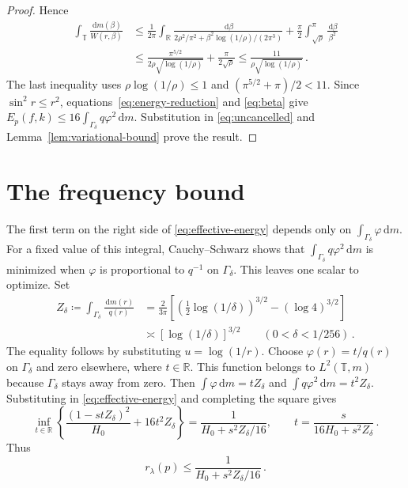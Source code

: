 \documentclass[11pt]{amsart}
\theoremstyle{plain}
\theoremstyle{definition}
\newcommand{\R}{\mathbb R}
\newcommand{\T}{\mathbb T}
\newcommand{\1}{\mathbf 1}
\newcommand{\dd}{\,\mathrm d}
\begin{document}
\begin{proof}
		Hence
		\begin{equation}\label{eq:beta}
			\begin{split}
				\int_\T\frac{\dd m(\beta)}{W(r,\beta)}
				&\leq\frac1{2\pi}\int_\R
				\frac{\dd\beta}{2\rho^2/\pi^2+
					\beta^2\log(1/\rho)/(2\pi^3)}
				+\frac\pi2\int_{\sqrt\rho}^\pi\frac{\dd\beta}{\beta^2}\\
				&\leq\frac{\pi^{5/2}}{2\rho\sqrt{\log(1/\rho)}}
				+\frac\pi{2\sqrt\rho}
				\leq\frac{11}{\rho\sqrt{\log(1/\rho)}}\, .
			\end{split}
		\end{equation}
		The last inequality uses $\rho\log(1/\rho)\leq1$ and
		$(\pi^{5/2}+\pi)/2<11$.
		Since $\sin^2r\leq r^2$, equations~\eqref{eq:energy-reduction} and
		\eqref{eq:beta} give $E_p(f,k)\leq16\int_{\Gamma_\delta}q\varphi^2\dd m$.
		Substitution in \eqref{eq:uncancelled} and Lemma~\ref{lem:variational-bound}
		prove the result.
	\end{proof}
	
	\section{The frequency bound}\label{sec:fixed-frequency}
	
	The first term on the right side of \eqref{eq:effective-energy} depends only on
	$\int_{\Gamma_\delta}\varphi\dd m$.
	For a fixed value of this integral, Cauchy--Schwarz shows that
	$\int_{\Gamma_\delta}q\varphi^2\dd m$ is minimized when $\varphi$ is proportional to
	$q^{-1}$ on $\Gamma_\delta$.  This leaves one scalar to optimize.  Set
	\begin{equation}\label{eq:Z}
		\begin{split}
			Z_\delta\coloneqq\int_{\Gamma_\delta}\frac{\dd m(r)}{q(r)}
			&=\frac{2}{3\pi}\left[
			\left(\tfrac12\log(1/\delta)\right)^{3/2}
			-(\log4)^{3/2}\right]\\
			&\asymp[\log(1/\delta)]^{3/2}
			\qquad(0<\delta<1/256)\, .
		\end{split}
	\end{equation}
	The equality follows by substituting $u=\log(1/r)$.
	Choose $\varphi(r)=t/q(r)$ on $\Gamma_\delta$ and zero elsewhere,
	where $t\in\R$.  This function belongs to $L^2(\T,m)$ because
	$\Gamma_\delta$ stays away from zero.  Then
	$\int\varphi\dd m=tZ_\delta$ and
	$\int q\varphi^2\dd m=t^2Z_\delta$.
	Substituting in \eqref{eq:effective-energy} and completing the square gives
	\begin{equation}\label{eq:scalar-minimum}
		\inf_{t\in\R}\left\{\frac{(1-stZ_\delta)^2}{H_0}
		+16t^2Z_\delta\right\}
		=\frac1{H_0+s^2Z_\delta/16},\qquad
		t=\frac{s}{16H_0+s^2Z_\delta}\, .
	\end{equation}
	Thus
	\begin{equation}\label{eq:optimized}
		r_\lambda(p)\leq\frac1{H_0+s^2Z_\delta/16}\, .
	\end{equation}
	
\end{document}
